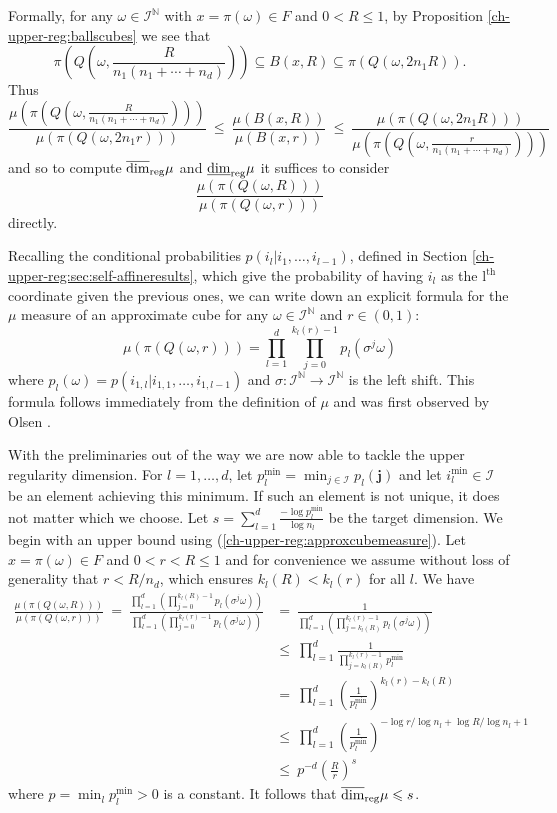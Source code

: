 Formally, for any $\omega \in \mathcal{I}^{\mathbb{N}}$ with $x= \pi(\omega) \in F$ and $0<R\le 1$, by Proposition \ref{ch-upper-reg:ballscubes} we see that
\[
\pi(Q(\omega, \frac{R}{n_1(n_1+ \cdots + n_d)}))  \subseteq B(x,R) \subseteq \pi (Q(\omega,2 n_1 R)).
\]
Thus
\[
\frac{\mu \left(\pi \left(Q\left(\omega,\frac{R}{n_1(n_1+ \cdots + n_d)}\right)\right)\right)} {\mu(\pi(Q(\omega,2n_1 r)))} \ \leq \  \frac{\mu(B(x,R))}{\mu(B(x,r))}  \ \leq \ \frac{\mu(\pi(Q(\omega,2n_1 R)))}{\mu \left(\pi \left(Q\left(\omega,\frac{r}{n_1(n_1+ \cdots + n_d)}\right)\right)\right)}
\]
and so to compute $\overline{\dim}_{\textup{reg}} \mu$ and $\underline{\dim}_{\textup{reg}} \mu$ it suffices to consider 
\[
\frac{\mu(\pi(Q(\omega,R)))}{\mu(\pi(Q(\omega,r)))} 
\]
directly. 


Recalling the conditional probabilities $p(i_{l}\vert i_{1},\ldots,i_{l-1})$, defined in Section \ref{ch-upper-reg:sec:self-affineresults}, which give the probability of having $i_{l}$ as the $\text{l}^{\text{th}}$ coordinate given the previous ones, we can write down an explicit formula for the $\mu $ measure of an approximate cube for any $\omega \in \mathcal{I}^{\mathbb{N}}$ and $r \in (0,1)$:
\begin{equation} \label{ch-upper-reg:approxcubemeasure}
\mu(\pi(Q(\omega,r)))=\prod^d_{l=1} \prod_{j=0}^{k_l(r)-1}p_l(\sigma^j\omega)
\end{equation}
where $p_l(\omega)=p(i_{1,l}\vert i_{1,1},\ldots,i_{1,l-1})$ and $\sigma: \mathcal{I}^{\mathbb{N}} \to \mathcal{I}^{\mathbb{N}}$ is the left shift.  This formula follows immediately from the definition of $\mu$ and was first observed by Olsen \cite[Equation 6.2]{sponges}.

With the preliminaries out of the way we are now able to tackle the upper regularity dimension. For $l=1,\ldots, d$, let $p_l^{\text{min}}=\min_{j\in \mathcal{I}} p_l(\mathbf{j})$  and let  $i_l^{\min} \in \mathcal{I}$ be an element achieving this minimum.  If such an element is not unique, it does not matter which we choose. Let $s=\sum_{l=1}^d\frac{-\log p_l^{\text{min}}}{\log n_l}$ be the target dimension. We begin with an upper bound using (\ref{ch-upper-reg:approxcubemeasure}). Let $x = \pi(\omega ) \in F$ and $0< r < R\le 1$ and for convenience we assume without loss of generality that $r < R/ n_d$, which ensures $k_l(R) < k_l(r)$ for all $l$.  We have
\begin{align*}
\frac{\mu(\pi(Q(\omega,R)))}{\mu(\pi(Q(\omega,r)))} \ = \ \frac{\prod_{l=1}^d\left(\prod_{j=0}^{k_l(R)-1}p_l(\sigma^j \omega) \right)}{\prod_{l=1}^d\left(\prod_{j=0}^{k_l(r)-1}p_l(\sigma^j \omega) \right)}  & = \ \frac{1}{\prod_{l=1}^d\left(\prod_{j=k_l(R)}^{k_l(r)-1}p_l(\sigma^j \omega) \right)} \\
& \le\  \prod_{l=1}^d \frac{1}{\prod_{j=k_l(R)}^{k_l(r)-1}p_l^{\text{min}}} \\
& =\  \prod_{l=1}^d\left( \frac{1}{p_l^{\text{min}}}\right)^{k_l(r)-k_l(R)} \\
& \le\  \prod_{l=1}^d \left( \frac{1}{p_l^{\text{min}}}\right)^{-\log r/\log n_l + \log R/\log n_l + 1}  \\
& \le \ p^{-d} \left( \frac{R}{r} \right)^{s}
\end{align*}
where $p = \min_l p_l^{\text{min}}>0$ is a constant. It follows that $\overline{\dim}_{\textup{reg}} \mu \leqslant s$.

